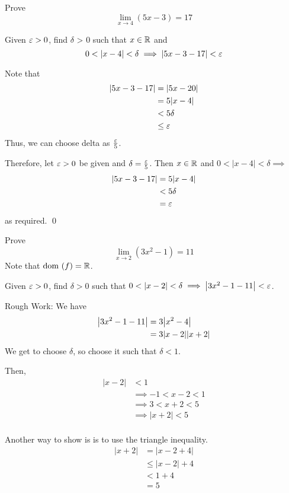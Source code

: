 \documentclass{article}
\begin{document}
\begin{examples}
Prove \[\lim_{x\to 4}(5x-3) = 17 \]

Given $\varepsilon > 0$, find $\delta$ > 0 such that $x \in \mathbb{R}$ and \[0 < \abs{x - 4} < \delta \implies |5x-3-17| < \varepsilon\]

Note that \begin{align*}
    |5x-3-17| &= |5x-20|\\
    &= 5|x-4|\\
    &< 5\delta\\
    &\leq \varepsilon\\
\end{align*}
Thus, we can choose delta as $\frac{\varepsilon}{5}$.

Therefore, let $\varepsilon > 0$ be given and $\delta = \frac{\varepsilon}{5} $. Then $x \in \mathbb{R}$ and $0 < |x-4| < \delta \implies$
\begin{align*}
    |5x-3-17| &= 5|x-4|\\
    &< 5\delta\\
    &= \varepsilon\\
\end{align*}
as required. \qed


Prove \[
\lim_{x\to 2}(3x^2-1) = 11
\]
Note that $\text{dom }(f) = \mathbb{R}$.

Given $\varepsilon > 0$, find $\delta > 0$ such that $0 < \abs{x-2} < \delta \implies \abs{3x^2 - 1 - 11} < \varepsilon$.

Rough Work:
We have 
\begin{align*}
    \abs{3x^2 - 1 - 11} &= 3\abs{x^2-4}\\
    &= 3|x-2||x+2|\\
\end{align*}
We get to choose $\delta$, so choose it such that $\delta < 1$.

Then, \begin{align*}
    |x-2| &< 1\\
    &\implies -1 < x-2 < 1\\
    &\implies 3 < x + 2 < 5\\
    &\implies |x+2| < 5\\
\end{align*}

Another way to show is is to use the triangle inequality.
\begin{align*}
    |x+2| &= |x-2 + 4|\\
    &\leq |x-2| + 4\\
    &< 1 + 4\\
    &= 5\\
\end{align*}


\end{examples}
\end{document}
